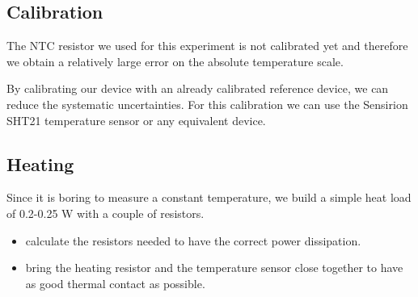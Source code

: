 \subsection{Calibration}\label{sec:calibration}

The NTC resistor we used for this experiment is not calibrated yet and therefore we obtain a relatively large error on the absolute temperature scale.
\vspace{0.5cm}
\begin{center}
\end{center}

By calibrating our device with an already calibrated reference device, we can reduce the systematic uncertainties. For this calibration we can use the Sensirion SHT21 temperature sensor or any equivalent device.

\vspace{0.5cm}
\begin{center}
\end{center}



\subsection{Heating}\label{sec:heat}
Since it is boring to measure a constant temperature, we build a simple heat load of 0.2-0.25 W with a couple of resistors.
\begin{itemize}
	\item calculate the resistors needed to have the correct power dissipation.
	\item bring the heating resistor and the temperature sensor close together to have as good thermal contact as possible.
\end{itemize}


